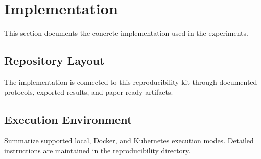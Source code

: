 \section{Implementation}

This section documents the concrete implementation used in the experiments.

\subsection{Repository Layout}

The implementation is connected to this reproducibility kit through documented
protocols, exported results, and paper-ready artifacts.

\subsection{Execution Environment}

Summarize supported local, Docker, and Kubernetes execution modes. Detailed
instructions are maintained in the reproducibility directory.
